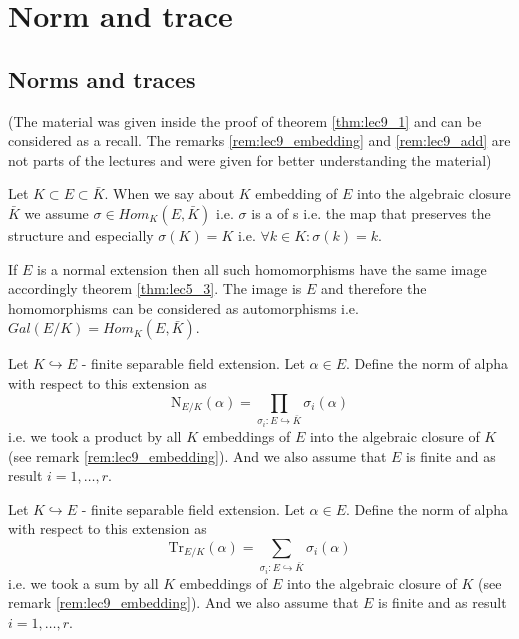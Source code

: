 \section{Norm and trace}

\subsection{Norms and traces}
(The material was given inside the proof of theorem \ref{thm:lec9_1}
and can be considered as a recall. The remarks
\ref{rem:lec9_embedding} and \ref{rem:lec9_add} are not parts of the
lectures and were given for better understanding the material)

\begin{remark}
  Let $K \subset E \subset \bar{K}$. When we say about $K$ embedding
  of $E$ into the algebraic closure $\bar{K}$ we assume
  $\sigma \in Hom_K\left(E, \bar{K}\right)$ i.e. $\sigma$ is a
   of s i.e. the map
  that preserves the structure and especially $\sigma(K) = K$ i.e.
  $\forall k \in K: \sigma(k) = k$.

  If $E$ is a normal extension then all such homomorphisms have the
  same image accordingly theorem \ref{thm:lec5_3}. The image is $E$
  and therefore the homomorphisms can be considered as automorphisms
  i.e. $Gal\left(E/K\right) = Hom_K\left(E, \bar{K}\right)$.
  \label{rem:lec9_embedding}
\end{remark}

\begin{definition}[Norm]
  Let $K \hookrightarrow E$ - finite separable field extension. Let $\alpha \in
  E$.   Define the norm of alpha with respect to this extension as
  \[
  \mathrm {N}_{E/K}\left(\alpha\right) =
  \prod_{\sigma_i: E \hookrightarrow \bar{K}} \sigma_i\left(\alpha\right)
  \]
  i.e. we took a product by all $K$ embeddings of $E$ into the
  algebraic closure of $K$ (see remark \ref{rem:lec9_embedding}).
  And we also assume that $E$ is
  finite and as result $i = 1, \dots, r$.
  \label{def:norm}
\end{definition}

\begin{definition}[Trace]
  Let $K \hookrightarrow E$ - finite separable field extension. Let $\alpha \in
  E$.   Define the norm of alpha with respect to this extension as
  \[
  \mathrm {Tr}_{E/K}\left(\alpha\right) =
  \sum_{\sigma_i: E \hookrightarrow \bar{K}} \sigma_i\left(\alpha\right)
  \]
  i.e. we took a sum by all $K$ embeddings of $E$ into the
  algebraic closure of $K$ (see remark \ref{rem:lec9_embedding}). And
  we also assume that $E$ is finite and as result $i = 1, \dots, r$. 
  \label{def:trace}
\end{definition}

